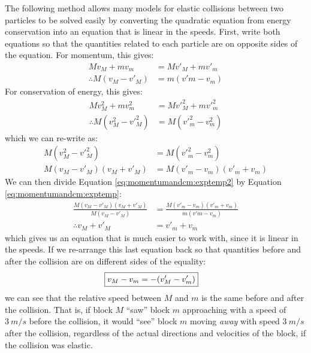 \begin{example}
The following method allows many models for elastic collisions between two particles to be solved easily by converting the quadratic equation from energy conservation into an equation that is linear in the speeds. First, write both equations so that the quantities related to each particle are on opposite sides of the equation. For momentum, this gives:
\begin{align}
\label{eq:momentumandcm:exptemp}
Mv_M+mv_m&=Mv'_M+mv'_m\nonumber\\
\therefore M(v_M-v'_M) &= m(v'm-v_m)
\end{align}
For conservation of energy, this gives:
\begin{align}
\label{eq:momentumandcm:exptemp2}
Mv_M^2+mv_m^2&=Mv'^2_M+mv'^2_m\nonumber\\
\therefore  M(v_M^2-v'^2_M)&= M(v'^2_m-v^2_m)
\end{align}
which we can re-write as:
\begin{align*}
M(v_M^2-v'^2_M)&= M(v'^2_m-v^2_m)\\
M(v_M-v'_M)(v_M+v'_M)&= M(v'_m-v_m)(v'_m+v_m)
\end{align*}
We can then divide Equation \ref{eq:momentumandcm:exptemp2} by Equation \ref{eq:momentumandcm:exptemp}:
\begin{align*}
\frac{M(v_M-v'_M)(v_M+v'_M)}{M(v_M-v'_M)}&= \frac{M(v'_m-v_m)(v'_m+v_m)}{m(v'm-v_m)}\\
\therefore v_M+v'_M&=v'_m+v_m
\end{align*}
which gives us an equation that is much easier to work with, since it is linear in the speeds. If we re-arrange this last equation back so that quantities before and after the collision are on different sides of the equality:
\begin{align*}
\Aboxed{v_M-v_m &= - (v'_M-v'_m)}
\end{align*}
we can see that the relative speed between $M$ and $m$ is the same before and after the collision. That is, if block $M$ ``saw'' block $m$ approaching with a speed of $\SI{3}{m/s}$ before the collision, it would ``see'' block $m$ moving \textit{away} with speed $\SI{3}{m/s}$ after the collision, regardless of the actual directions and velocities of the block, if the collision was elastic.


\end{example}

